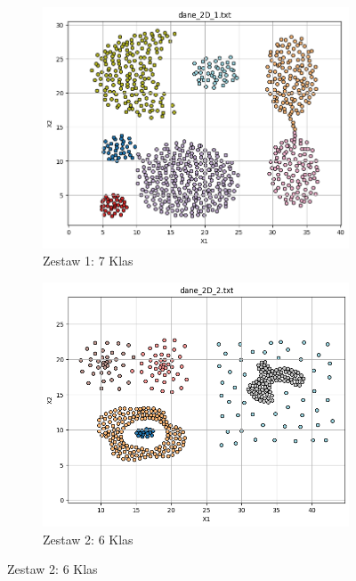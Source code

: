 \documentclass[polish,12pt,a4paper]{extarticle}
\begin{document}
\begin{figure}[h!]
    \centering
    \begin{subfigure}[b]{0.30\textwidth}
        \includegraphics[width=\linewidth]{img/data/dane1.png}
        \captionsetup{labelformat=empty}
        \caption{Zestaw 1: 7 Klas}
    \end{subfigure}
    \hfill
    \begin{subfigure}[b]{0.30\textwidth}
        \includegraphics[width=\linewidth]{img/data/dane2.png}
        \captionsetup{labelformat=empty}
        \caption{Zestaw 2: 6 Klas}
    \end{subfigure}

\end{figure}
\end{document}
